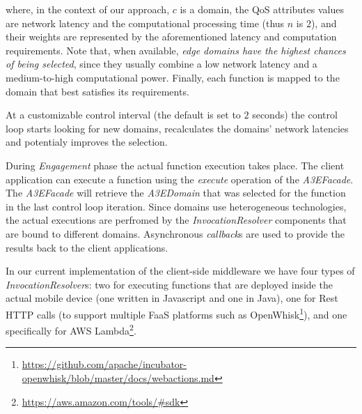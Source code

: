 where, in the context of our approach, $c$ is a domain, the QoS attributes values are network latency and the computational processing time (thus $n$ is $2$), and their weights are represented by the aforementioned latency and computation requirements. Note that, when available, \textit{edge domains have the highest chances of being selected}, since they usually combine a low network latency and a medium-to-high computational power. Finally, each function is mapped to the domain that best satisfies its requirements. 

At a customizable control interval (the default is set to $2$ seconds) the control loop starts looking for new domains, recalculates the domains' network latencies and potentialy  improves the selection.

During \textit{Engagement} phase the actual function execution takes place. The client application can execute a function using the \textit{execute} operation of the  \textit{A3EFacade}. %
The \textit{A3EFacade} will retrieve the \textit{A3EDomain} that was selected for the function in the last control loop iteration. Since domains use heterogeneous technologies, the actual executions are perfromed by the \textit{InvocationResolver} components that are bound to different domains. Asynchronous \textit{callback}s are used to provide the results back to the client applications. %



In our current implementation of the client-side middleware we have four types of \textit{InvocationResolver}s: two for executing functions that are deployed inside the actual mobile device (one written in Javascript and one in Java), one for Rest HTTP calls (to support multiple FaaS platforms such as OpenWhisk\footnote{\url{https://github.com/apache/incubator-openwhisk/blob/master/docs/webactions.md}}), and one specifically for AWS Lambda\footnote{\url{https://aws.amazon.com/tools/\#sdk}}. %


